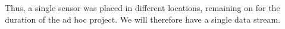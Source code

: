 Thus, a single sensor was placed in different locations, remaining on for the duration of the ad hoc project. We will therefore have a single data stream.





